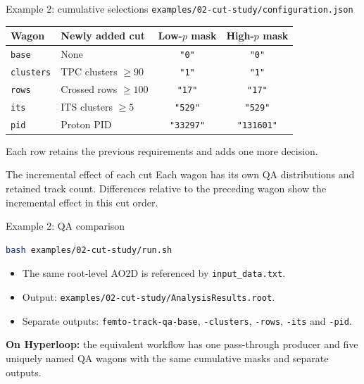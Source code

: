 \begin{frame}{Example 2: cumulative selections}
 \small \texttt{examples/02-cut-study/configuration.json}
 \medskip
 \renewcommand{\arraystretch}{1.3}
 \begin{tabular}{llcc}
 \toprule
 Wagon & Newly added cut & Low-$p$ mask & High-$p$ mask\\
 \midrule
 \texttt{base} & None & \texttt{"0"} & \texttt{"0"}\\
 \texttt{clusters} & TPC clusters $\geq90$ & \texttt{"1"} & \texttt{"1"}\\
 \texttt{rows} & Crossed rows $\geq100$ & \texttt{"17"} & \texttt{"17"}\\
 \texttt{its} & ITS clusters $\geq5$ & \texttt{"529"} & \texttt{"529"}\\
 \texttt{pid} & Proton PID & \texttt{"33297"} & \texttt{"131601"}\\
 \bottomrule
 \end{tabular}
 \medskip
 Each row retains the previous requirements and adds one more decision.
 \begin{block}{The incremental effect of each cut}
 Each wagon has its own QA distributions and retained track count. Differences relative to the preceding wagon show the incremental effect in this cut order.
 \end{block}
\end{frame}

\begin{frame}[fragile]{Example 2: QA comparison}
 \begin{lstlisting}[language=bash]
 bash examples/02-cut-study/run.sh
 \end{lstlisting}
 \begin{itemize}
 \item The same root-level AO2D is referenced by \texttt{input\_data.txt}.
 \item Output: \texttt{examples/02-cut-study/AnalysisResults.root}.
 \item Separate outputs: \texttt{femto-track-qa-base}, \texttt{-clusters}, \texttt{-rows}, \texttt{-its} and \texttt{-pid}.
 \end{itemize}
 \medskip
 \textbf{On Hyperloop:} the equivalent workflow has one pass-through producer and five uniquely named QA wagons with the same cumulative masks and separate outputs.
\end{frame}
